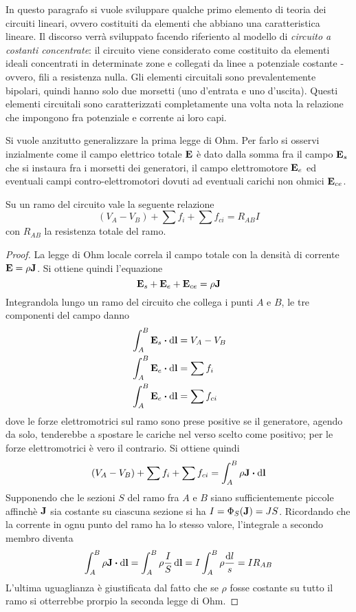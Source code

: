 In questo paragrafo si vuole sviluppare qualche primo elemento di teoria dei circuiti lineari,
ovvero costituiti da elementi che abbiano una caratteristica lineare.
Il discorso verrà sviluppato facendo riferiento al modello di \textit{circuito a costanti concentrate}:
il circuito viene considerato come costituito da elementi ideali concentrati in determinate zone
e collegati da linee a potenziale costante -ovvero, fili a resistenza nulla. Gli elementi circuitali
sono prevalentemente bipolari, quindi hanno solo due morsetti (uno d'entrata e uno d'uscita). Questi
elementi circuitali sono caratterizzati completamente una volta nota la relazione che impongono fra potenziale
e corrente ai loro capi.

Si vuole anzitutto generalizzare la prima legge di Ohm. Per farlo si osservi inzialmente come
il campo elettrico totale $\vb{E}$ è dato dalla somma fra il campo $\vb{E}_s$ che si instaura fra
i morsetti dei generatori, il campo elettromotore $\vb{E}_e$ ed eventuali campi contro-elettromotori
dovuti ad eventuali carichi non ohmici $\vb{E}_{ce}$.
\begin{thm}
    Su un ramo del circuito vale la seguente relazione
    \[
        (V_A-V_B)+\sum f_i+\sum f_{ci}=R_{AB}I
    \]
    con $R_{AB}$ la resistenza totale del ramo.
\end{thm}
\begin{proof}
    La legge di Ohm locale correla il
    campo totale con la densità di corrente $\vb{E}=\rho\vb{J}$. Si ottiene quindi l'equazione
    \[
        \vb{E}_s+\vb{E}_e+\vb{E}_{ce}=\rho\vb{J}
    \]
    Integrandola lungo un ramo del circuito che collega i punti $A$ e $B$, le tre componenti del campo
    danno
    \[
        \begin{split}
            &\int_A^B \vb{E}_s\vdot \dd{\vb{l}}=V_A-V_B \\
            &\int_A^B \vb{E}_e\vdot \dd{\vb{l}}=\sum f_i \\
            &\int_A^B \vb{E}_e\vdot \dd{\vb{l}}=\sum f_{ci} \\
        \end{split}
    \]
    dove le forze elettromotrici sul ramo sono prese positive se il generatore, agendo da solo, tenderebbe
    a spostare le cariche nel verso scelto come positivo; per le forze elettromotrici è vero il contrario.
    Si ottiene quindi
    \[
        (V_A-V_B)+\sum f_i+\sum f_{ci}=\int_A^B \rho\vb{J}\vdot\dd{\vb{l}}
    \]
    Supponendo che le sezioni $S$ del ramo fra $A$ e $B$ siano sufficientemente piccole affinchè
    $\vb{J}$ sia costante su ciascuna sezione si ha $I=\Phi_S(\vb{J})=JS$. Ricordando che la corrente
    in ognu punto del ramo ha lo stesso valore, l'integrale a secondo membro diventa
    \[
        \int_A^B\rho\vb{J}\vdot\dd{\vb{l}}=\int_A^B\rho\frac{I}{S}\dd{\vb{l}}=I\int_A^B\rho\frac{\dd{l}}{s}=IR_{AB}
    \]
    L'ultima uguaglianza è giustificata dal fatto che se $\rho$ fosse costante su tutto il ramo si otterrebbe
    prorpio la seconda legge di Ohm.
\end{proof}
